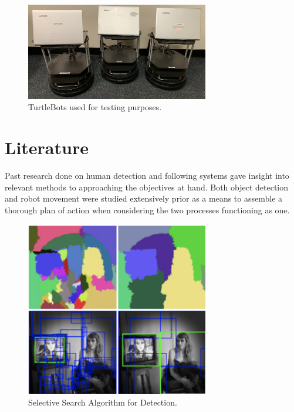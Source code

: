 \documentclass{ndjflart}
\theoremstyle{definition}
\theoremstyle{remark}
\begin{document}
\begin{figure}
\begin{center}
\vspace{0.5em}
    \includegraphics[width=8cm]{images/turtlebots}
    \vspace{-.5em}
\caption{TurtleBots used for testing purposes. }
\label{fig:framework}
    \end{center}
\end{figure}

\section{Literature}\label{front}
Past research done on human detection and following systems gave insight into relevant methods to approaching the objectives at hand. Both object detection and robot movement were studied extensively prior as a means to assemble a thorough plan of action when considering the two processes functioning as one.

\begin{figure}
\begin{center}
\vspace{0.5em}
    \includegraphics[width=8cm]{images/detection}
    \vspace{-.5em}
\caption{Selective Search Algorithm for Detection. }
\label{fig:framework}
    \end{center}
\end{figure}
\end{document}
